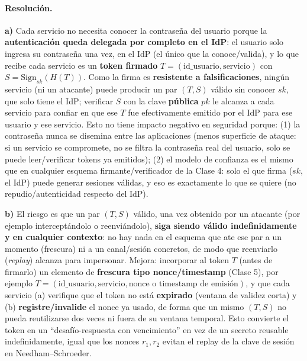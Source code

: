 \paragraph{Resolución.}

\textbf{a)} Cada servicio no necesita conocer la contraseña del usuario porque la
\textbf{autenticación queda delegada por completo en el IdP}: el usuario solo ingresa su
contraseña una vez, en el IdP (el único que la conoce/valida), y lo que recibe cada servicio
es un \textbf{token firmado} $T=(\text{id\_usuario},\text{servicio})$ con
$S=\mathrm{Sign}_{sk}(H(T))$. Como la firma es \textbf{resistente a falsificaciones}, ningún
servicio (ni un atacante) puede producir un par $(T,S)$ válido sin conocer $sk$, que solo
tiene el IdP; verificar $S$ con la clave \textbf{pública} $pk$ le alcanza a cada servicio
para confiar en que ese $T$ fue efectivamente emitido por el IdP para ese usuario y ese
servicio. Esto no tiene impacto negativo en seguridad porque: (1) la contraseña nunca se
disemina entre las aplicaciones (menos superficie de ataque: si un servicio se compromete, no
se filtra la contraseña real del usuario, solo se puede leer/verificar tokens ya emitidos);
(2) el modelo de confianza es el mismo que en cualquier esquema firmante/verificador de la
Clase 4: solo el que firma ($sk$, el IdP) puede generar sesiones válidas, y eso es
exactamente lo que se quiere (no repudio/autenticidad respecto del IdP).

\textbf{b)} El riesgo es que un par $(T,S)$ válido, una vez obtenido por un atacante (por
ejemplo interceptándolo o reenviándolo), \textbf{siga siendo válido indefinidamente y en
cualquier contexto}: no hay nada en el esquema que ate ese par a un momento (frescura) ni a
un canal/sesión concretos, de modo que reenviarlo (\emph{replay}) alcanza para impersonar.
Mejora: incorporar al token $T$ (antes de firmarlo) un elemento de \textbf{frescura tipo
nonce/timestamp} (Clase 5), por ejemplo $T=(\text{id\_usuario},\text{servicio},\text{nonce o
timestamp de emisión})$, y que cada servicio (a) verifique que el token no está
\textbf{expirado} (ventana de validez corta) y (b) \textbf{registre/invalide} el nonce ya
usado, de forma que un mismo $(T,S)$ no pueda reutilizarse dos veces ni fuera de su ventana
temporal. Esto convierte el token en un ``desafío-respuesta con vencimiento'' en vez de un
secreto reusable indefinidamente, igual que los nonces $r_1,r_2$ evitan el replay de la clave
de sesión en Needham--Schroeder.

